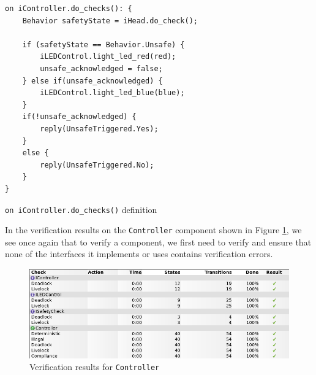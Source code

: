 \documentclass[12pt]{scrreprt}
\begin{document}
\begin{listing}[!ht]
\begin{verbatim}
on iController.do_checks(): {
    Behavior safetyState = iHead.do_check();
	
    if (safetyState == Behavior.Unsafe) {
        iLEDControl.light_led_red(red);
        unsafe_acknowledged = false;
    } else if(unsafe_acknowledged) {
        iLEDControl.light_led_blue(blue);
    }
    if(!unsafe_acknowledged) {
        reply(UnsafeTriggered.Yes);
    }
    else {
        reply(UnsafeTriggered.No);
    }
}

 \end{verbatim} 
\caption{\texttt{on iController.do\_checks()} definition} \label{mdo_checks}
 \end{listing} 
 
In the verification results on the \texttt{Controller} component shown in Figure \ref{fig:controll_verif}, we see once again that to verify a component, we first need to verify and ensure that none of the interfaces it implements or uses contains verification errors.
 
\begin{figure}[H]
    \centering
    \includegraphics[width=\textwidth]{Figures/results/modelling_figures/Controller/Controller_verification.png}
    \caption{Verification results for \texttt{Controller}}
    \label{fig:controll_verif}
\end{figure}
\end{document}
